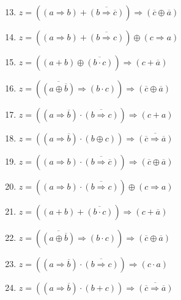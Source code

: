 \hfill
\begin{minipage}[t]{7cm}
\begin{enumerate}\setcounter{enumi}{12}
\item $z = ({(a \Rightarrow b)} + \overline{(b \Rightarrow \overline{c})}) \Rightarrow (\overline{c} \oplus \overline{a})$ 
\item $z = (({a} \Rightarrow {b}) + \overline{(b \Rightarrow c)}) \oplus ({c} \Rightarrow {a})$
\item $z = ({(a + b)} \oplus \overline{(b \cdot c)}) \Rightarrow ({c} + \overline{a})$
\item $z = (\overline{(a \oplus \overline{b})} \Rightarrow (b \cdot c)) \Rightarrow (\overline{c} \oplus \overline{a})$
\item $z = ((a \Rightarrow \overline{b}) \cdot \overline{(b \Rightarrow c)}) \Rightarrow ({c} + {a})$
\item $z = ((a \Rightarrow \overline{b}) \cdot (b \oplus c)) \Rightarrow \overline{(\overline{c} \Rightarrow \overline{a})}$
\item $z = ({(a \Rightarrow b)} \cdot \overline{(b \Rightarrow \overline{c})}) \Rightarrow (\overline{c} \oplus \overline{a})$ 
\item $z = (({a} \Rightarrow {b}) \cdot \overline{(b \Rightarrow c)}) \oplus ({c} \Rightarrow {a})$
\item $z = ({(a + b)} + \overline{(b \cdot c)}) \Rightarrow ({c} + \overline{a})$
\item $z = (\overline{(a \oplus \overline{b})} \Rightarrow (b \cdot c)) \Rightarrow (\overline{c} \oplus \overline{a})$
\item $z = ((a \Rightarrow \overline{b}) \cdot \overline{(b \Rightarrow c)}) \Rightarrow ({c} \cdot {a})$
\item $z = ((a \Rightarrow \overline{b}) \cdot (b + c)) \Rightarrow \overline{(\overline{c} \Rightarrow \overline{a})}$
\end{enumerate}
\end{minipage}


